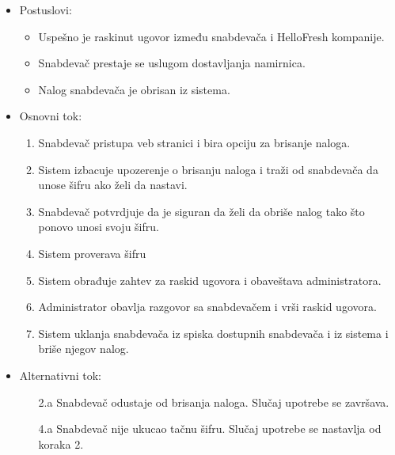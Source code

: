 \begin{itemize}
\begin{itemize}
        \end{itemize}
    \item Postuslovi:
        \begin{itemize}
            \item Uspešno je raskinut ugovor između snabdevača i HelloFresh kompanije.
            \item Snabdevač prestaje se uslugom dostavljanja namirnica.
            \item Nalog snabdevača je obrisan iz sistema.
        \end{itemize}
    \item Osnovni tok:
        \begin{enumerate}
            \item Snabdevač pristupa veb stranici i bira opciju za brisanje naloga.
            \item Sistem izbacuje upozerenje o brisanju naloga i traži od snabdevača da unose šifru ako želi da nastavi.
            \item Snabdevač potvrdjuje da je siguran da želi da obriše nalog tako što ponovo unosi svoju šifru.
            \item Sistem proverava šifru
            \item Sistem obrađuje zahtev za raskid ugovora i obaveštava administratora.
            \item Administrator obavlja razgovor sa snabdevačem i vrši raskid ugovora.
            \item Sistem uklanja snabdevača iz spiska dostupnih snabdevača i iz sistema i briše njegov nalog.
        \end{enumerate}
    \item Alternativni tok:
        \begin{itemize}
            \item[2.a] Snabdevač odustaje od brisanja naloga. Slučaj upotrebe se završava.
            \item[4.a] Snabdevač nije ukucao tačnu šifru. Slučaj upotrebe se nastavlja od koraka 2.
        \end{itemize}
\end{itemize}

